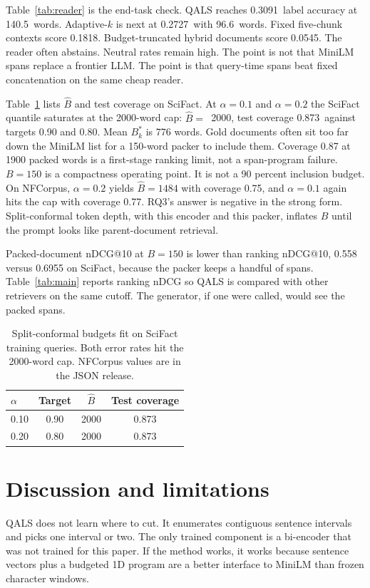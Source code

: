 \documentclass[preprint,12pt,authoryear]{elsarticle}
\newcommand{\ConfBhatA}{2000}
\newcommand{\ConfCovA}{0.873}
\newcommand{\ConfBhatB}{2000}
\newcommand{\ConfCovB}{0.873}
\newcommand{\RagQalsAcc}{0.3091}
\newcommand{\RagQalsTok}{140.5}
\newcommand{\RagLcAcc}{0.1818}
\newcommand{\RagParentAcc}{0.2727}
\newcommand{\RagParentTok}{96.6}
\newcommand{\RagHybridAcc}{0.0545}
\begin{document}
Table~\ref{tab:reader} is the end-task check. QALS reaches \RagQalsAcc\ label accuracy at \RagQalsTok\ words. Adaptive-\(k\) is next at \RagParentAcc\ with \RagParentTok\ words. Fixed five-chunk contexts score \RagLcAcc. Budget-truncated hybrid documents score \RagHybridAcc. The reader often abstains. Neutral rates remain high. The point is not that MiniLM spans replace a frontier LLM. The point is that query-time spans beat fixed concatenation on the same cheap reader.

Table~\ref{tab:conf} lists \(\hat{B}\) and test coverage on SciFact. At \(\alpha=0.1\) and \(\alpha=0.2\) the SciFact quantile saturates at the 2000-word cap: \(\hat{B}=\)~\ConfBhatA, test coverage \ConfCovA\ against targets 0.90 and 0.80. Mean \(B_k^*\) is 776 words. Gold documents often sit too far down the MiniLM list for a 150-word packer to include them. Coverage 0.87 at 1900 packed words is a first-stage ranking limit, not a span-program failure. \(B=150\) is a compactness operating point. It is not a 90 percent inclusion budget. On NFCorpus, \(\alpha=0.2\) yields \(\hat{B}=1484\) with coverage 0.75, and \(\alpha=0.1\) again hits the cap with coverage 0.77. RQ3's answer is negative in the strong form. Split-conformal token depth, with this encoder and this packer, inflates \(B\) until the prompt looks like parent-document retrieval.

Packed-document nDCG@10 at \(B=150\) is lower than ranking nDCG@10, 0.558 versus 0.6955 on SciFact, because the packer keeps a handful of spans. Table~\ref{tab:main} reports ranking nDCG so QALS is compared with other retrievers on the same cutoff. The generator, if one were called, would see the packed spans.

\begin{table}[t]
\centering
\caption{Split-conformal budgets fit on SciFact training queries. Both error rates hit the 2000-word cap. NFCorpus values are in the JSON release.}
\label{tab:conf}
\begin{tabular}{lccc}
\toprule
\(\alpha\) & Target & \(\hat{B}\) & Test coverage \\
\midrule
0.10 & 0.90 & \ConfBhatA & \ConfCovA \\
0.20 & 0.80 & \ConfBhatB & \ConfCovB \\
\bottomrule
\end{tabular}
\end{table}

\section{Discussion and limitations}
\label{sec:limits}
QALS does not learn where to cut. It enumerates contiguous sentence intervals and picks one interval or two. The only trained component is a bi-encoder that was not trained for this paper. If the method works, it works because sentence vectors plus a budgeted 1D program are a better interface to MiniLM than frozen character windows.
\end{document}

